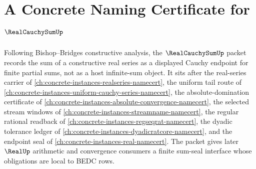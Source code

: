 \chapter{A Concrete Naming Certificate for $\RealCauchySumUp$}
\label{ch:concrete-instances-real-cauchy-sum-namecert}

Following Bishop--Bridges constructive analysis, the $\RealCauchySumUp$ packet records the sum of a constructive real series as a displayed Cauchy endpoint for finite partial sums, not as a host infinite-sum object. It sits after the real-series carrier of \autoref{ch:concrete-instances-realseries-namecert}, the uniform tail route of \autoref{ch:concrete-instances-uniform-cauchy-series-namecert}, the absolute-domination certificate of \autoref{ch:concrete-instances-absolute-convergence-namecert}, the selected stream windows of \autoref{ch:concrete-instances-streamname-namecert}, the regular rational readback of \autoref{ch:concrete-instances-regseqrat-namecert}, the dyadic tolerance ledger of \autoref{ch:concrete-instances-dyadicratcore-namecert}, and the endpoint seal of \autoref{ch:concrete-instances-real-namecert}. The packet gives later $\RealUp$ arithmetic and convergence consumers a finite sum-seal interface whose obligations are local to BEDC rows.

